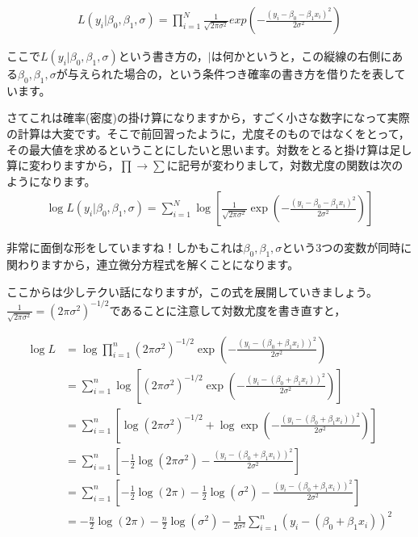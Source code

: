 \documentclass{ltjbook}
\begin{document}
\begin{align}
L(y_i | \beta_0,\beta_1,\sigma) = \prod_{i=1}^N \frac{1}{\sqrt{2\pi \sigma^2}}exp\left(- \frac{(y_i-\beta_0 - \beta_1 x_i)^2}{2\sigma^2}\right)
\end{align}

ここで$L(y_i | \beta_0,\beta_1,\sigma) $という書き方の，$\mid$は何かというと，この縦線の右側にある$\beta_0,\beta_1,\sigma$が与えられた場合の，という条件つき確率の書き方を借りたを表しています。

さてこれは確率(密度)の掛け算になりますから，すごく小さな数字になって実際の計算は大変です。そこで前回習ったように，尤度そのものではなくをとって，その最大値を求めるということにしたいと思います。対数をとると掛け算は足し算に変わりますから，$\prod \to \sum$に記号が変わりまして，対数尤度の関数は次のようになります。
\begin{align}
\log L(y_i | \beta_0,\beta_1,\sigma) = \sum_{i=1}^N \log \left[ \frac{1}{\sqrt{2\pi \sigma^2}}\exp\left(- \frac{(y_i-\beta_0 - \beta_1 x_i)^2}{2\sigma^2}\right) \right]
\end{align}

非常に面倒な形をしていますね！しかもこれは$\beta_0,\beta_1,\sigma$という3つの変数が同時に関わりますから，連立微分方程式を解くことになります。

ここからは少しテクい話になりますが，この式を展開していきましょう。$\frac{1}{\sqrt{2\pi\sigma^2}}=(2\pi\sigma^2)^{-1/2}$であることに注意して対数尤度を書き直すと，

\begin{align*}
\log L &= \log\prod_{i=1}^n (2\pi\sigma^2)^{-1/2}\exp\left(-\frac{(y_i-(\beta_0+\beta_1x_i))^2}{2\sigma^2}\right) \\
&= \sum_{i=1}^n \log\left[(2\pi\sigma^2)^{-1/2}\exp\left(-\frac{(y_i-(\beta_0+\beta_1x_i))^2}{2\sigma^2}\right)\right] \\
&= \sum_{i=1}^n \left[\log(2\pi\sigma^2)^{-1/2} + \log\exp\left(-\frac{(y_i-(\beta_0+\beta_1x_i))^2}{2\sigma^2}\right)\right] \\
&= \sum_{i=1}^n \left[-\frac{1}{2}\log(2\pi\sigma^2) - \frac{(y_i-(\beta_0+\beta_1x_i))^2}{2\sigma^2}\right]\\
&= \sum_{i=1}^n \left[-\frac{1}{2}\log(2\pi) - \frac{1}{2}\log(\sigma^2) - \frac{(y_i-(\beta_0+\beta_1x_i))^2}{2\sigma^2}\right]\\
&= -\frac{n}{2} \log(2\pi) - \frac{n}{2} \log(\sigma^2) - \frac{1}{2\sigma^2} \sum_{i=1}^{n} (y_i-(\beta_0+\beta_1x_i))^2
\end{align*}
\end{document}
